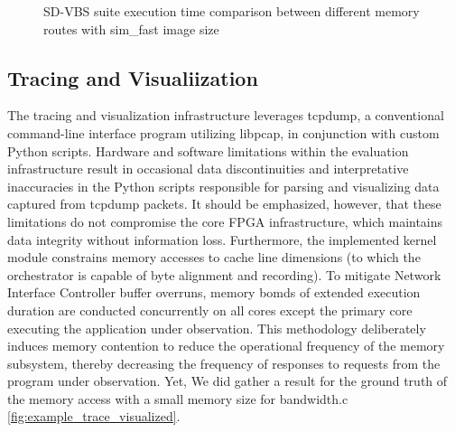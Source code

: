 \begin{figure}
\centering

\caption{SD-VBS suite execution time comparison between different memory routes with sim_fast image size}
\label{fig:sdvbsresult-sim-fast}
\end{figure}

\subsection{Tracing and Visualiization}

The tracing and visualization infrastructure leverages tcpdump, a conventional command-line interface program utilizing libpcap, in conjunction with custom Python scripts. Hardware and software limitations within the evaluation infrastructure result in occasional data discontinuities and interpretative inaccuracies in the Python scripts responsible for parsing and visualizing data captured from tcpdump packets. It should be emphasized, however, that these limitations do not compromise the core FPGA infrastructure, which maintains data integrity without information loss. Furthermore, the implemented kernel module constrains memory accesses to cache line dimensions (to which the orchestrator is capable of byte alignment and recording). To mitigate Network Interface Controller buffer overruns, memory bomds of extended execution duration are conducted concurrently on all cores except the primary core executing the application under observation. This methodology deliberately induces memory contention to reduce the operational frequency of the memory subsystem, thereby decreasing the frequency of responses to requests from the program under observation. Yet, We did gather a result for the ground truth of the memory access with a small memory size for bandwidth.c \ref{fig:example_trace_visualized}.

